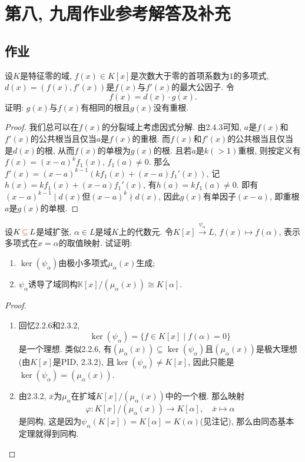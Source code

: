\documentclass{../solutions-cn}
\begin{document}
\section*{第八, 九周作业参考解答及补充}

\subsection*{作业}

\begin{exercise}[习题3.1.1]
    设$K$是特征零的域, $f(x) \in K[x]$是次数大于零的首项系数为$1$的多项式, $d(x) = (f(x), f'(x))$是$f(x)$与$f'(x)$的最大公因子. 令
    \[
        f(x) = d(x) \cdot g(x).
    \]
    证明: $g(x)$与$f(x)$有相同的根且$g(x)$没有重根.
\end{exercise}

\begin{proof}
    我们总可以在$f(x)$的分裂域上考虑因式分解. 由2.4.3可知, $a$是$f(x)$和$f'(x)$的公共根当且仅当$a$是$f(x)$的重根. 而$f(x)$和$f'(x)$的公共根当且仅当是$d(x)$的根, 从而$f(x)$的单根为$g(x)$的根. 且若$a$是$k(>1)$重根, 则按定义有$f(x) = (x - a)^kf_1(x)$, $f_1(a) \neq 0$. 那么$f'(x) = (x - a)^{k - 1}(kf_1(x) + (x - a)f_1'(x))$, 记$h(x) = kf_1(x) + (x - a)f_1'(x)$, 有$h(a) = kf_1(a) \neq 0$. 即有$(x - a)^{k - 1} \mid d(x)$但$(x - a)^k \nmid d(x)$, 因此$g(x)$有单因子$(x - a)$, 即重根$a$是$g(x)$的单根.
\end{proof}

\begin{exercise}[习题3.1.2]
    设$K \,\textcolor{red}{\subseteq}\, L$是域扩张, $\alpha \in L$是域$K$上的代数元. 令$K[x] \xrightarrow{\psi_{\alpha}}L$, $f(x) \mapsto f(\alpha)$, 表示多项式在$x = \alpha$的取值映射. 试证明:
    \begin{enumerate}[(1)]
        \item $\ker(\psi_\alpha)$由极小多项式$\mu_\alpha(x)$生成;
        \item $\psi_\alpha$诱导了域同构$\mathbb{K}[x]/(\mu_\alpha(x)) \cong K[\alpha]$.
    \end{enumerate}
\end{exercise}

\begin{proof}
    \begin{enumerate}[(1)]
        \item 回忆2.2.6和2.3.2,
        \[
            \ker(\psi_\alpha) = \{f \in K[x] \mid f(\alpha) = 0\}
        \]
        是一个理想. 类似2.2.6, 有$(\mu_\alpha(x)) \subseteq \ker(\psi_\alpha)$且$(\mu_\alpha(x))$是极大理想(由$K[x]$是PID, 2.3.2), 且$\ker(\psi_\alpha) \neq K[x]$, 因此只能是$\ker(\psi_\alpha) = (\mu_\alpha(x))$.
        \item 由2.3.2, $\overline{x}$为$\mu_\alpha$在扩域$K[x]/(\mu_\alpha(x))$中的一个根. 那么映射
        \[
            \varphi: K[x]/(\mu_\alpha(x)) \to K[\alpha],\quad \overline{x} \mapsto \alpha
        \]
        是同构, 这是因为$\psi_\alpha(K[x]) = K[\alpha] = K(\alpha)$(见注记), 那么由同态基本定理就得到同构.
    \end{enumerate}
\end{proof}
\end{document}
